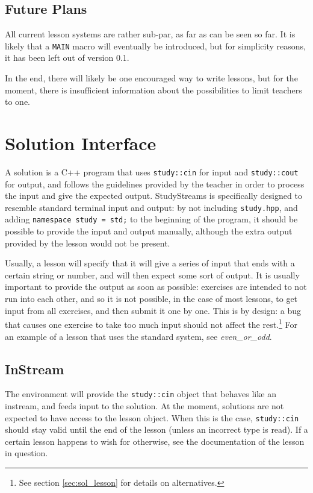 \documentclass[12pt,a4paper]{report}
\begin{document}
		\section{Future Plans}
		All current lesson systems are rather sub-par, as far as can be seen so far.
		It is likely that a \texttt{MAIN} macro will eventually be introduced, but
		for simplicity reasons, it has been left out of version 0.1.

		In the end, there will likely be one encouraged way to write lessons, but 
		for the moment, there is insufficient information about the possibilities
		to limit teachers to one.

	\chapter{Solution Interface}
		A solution is a C++ program that uses \texttt{study::cin} for input and
		\texttt{study::cout} for output, and follows the guidelines provided by
		the teacher in order to process the input and give the expected output.
		StudyStreams is specifically designed to resemble standard terminal
		input and output:  by not including \texttt{study.hpp}, and adding
		\texttt{namespace study = std;} to the beginning of the program, it
		should be possible to provide the input and output manually, although
		the extra output provided by the lesson would not be present.

		Usually, a lesson will specify that it will give a series of input that
		ends with a certain string or number, and will then expect some sort of
		output.  It is usually important to provide the output as soon as
		possible:  exercises are intended to not run into each other, and so it
		is not possible, in the case of most lessons, to get input from all
		exercises, and then submit it one by one.  This is by design:  a bug
		that causes one exercise to take too much input should not affect the
		rest.\footnote{See section \ref{sec:sol_lesson} for details on
		alternatives.} For an example of a lesson that uses the standard system,
		see \textit{even\_or\_odd}.

		\section{InStream}
		The environment will provide the \texttt{study::cin} object that behaves
		like an instream, and feeds input to the solution.  At the moment,
		solutions are not expected to have access to the lesson object.  When this
		is the case, \texttt{study::cin} should stay valid until the end of the
		lesson (unless an incorrect type is read).  If a certain lesson happens to
		wish for otherwise, see the documentation of the lesson in question.
\end{document}
